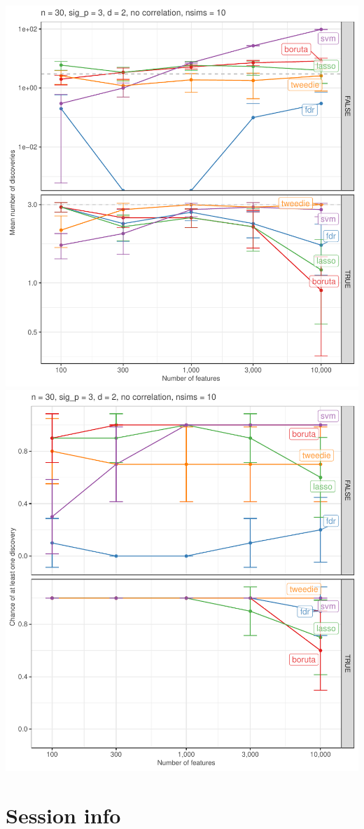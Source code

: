 \documentclass[
]{article}
\begin{document}
\begin{center}\includegraphics[width=0.49\linewidth]{main_files/figure-latex/unnamed-chunk-32-1} \includegraphics[width=0.49\linewidth]{main_files/figure-latex/unnamed-chunk-32-2} \end{center}

\hypertarget{sessioninfo}{%
\section{Session info}\label{sessioninfo}}
\end{document}
